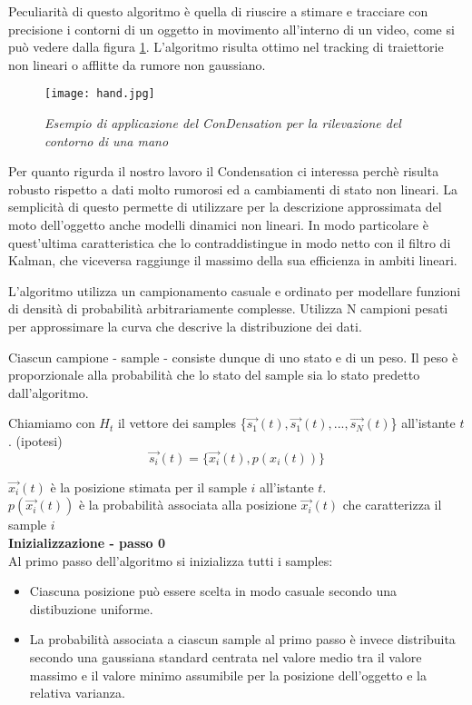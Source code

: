 Peculiarità di questo algoritmo è quella di riuscire a stimare e tracciare con precisione i contorni di un oggetto in movimento all'interno di un video, come si può vedere dalla figura \ref{fig:hand}. L'algoritmo risulta ottimo nel tracking di traiettorie non lineari o afflitte da rumore non gaussiano.

\begin{figure}[hb]
\centering
	\texttt{[image: hand.jpg]}
\caption{\textit{Esempio di applicazione del ConDensation per la rilevazione del contorno di una mano}\label{fig:hand}}
\end{figure}

Per quanto rigurda il nostro lavoro il Condensation ci interessa perchè risulta robusto rispetto a dati molto rumorosi ed a cambiamenti di stato non lineari. La semplicità di questo permette di utilizzare per la descrizione approssimata del moto dell'oggetto anche modelli dinamici non lineari. In modo particolare è quest'ultima caratteristica che lo contraddistingue in modo netto con il filtro di Kalman, che viceversa raggiunge il massimo della sua efficienza in ambiti lineari. 

L'algoritmo utilizza un campionamento casuale e ordinato per modellare funzioni di densità di probabilità arbitrariamente complesse. Utilizza N campioni pesati per approssimare la curva che descrive la distribuzione dei dati.

Ciascun campione - sample - consiste dunque di uno stato e di un peso. Il peso è proporzionale alla probabilità che lo stato del sample sia lo stato predetto dall'algoritmo.

Chiamiamo con $H_{t}$ il vettore dei samples \{$\overrightarrow{s_1}(t),\overrightarrow{s_1}(t),...,\overrightarrow{s_N}(t)$\} all'istante $t$. (ipotesi)
\begin{equation}
	\overrightarrow{s_i}(t)= \{\overrightarrow{x_i}(t),p(x_i(t))\}
\end{equation}

$\overrightarrow{x_i}(t)$ è la posizione stimata per il sample $i$ all'istante $t$.\\
$p(\overrightarrow{x_i}(t))$ è la probabilità associata alla posizione $\overrightarrow{x_i}(t)$ che caratterizza il sample $i$\\

\textbf{Inizializzazione - passo 0}\\
Al primo passo dell'algoritmo si inizializza tutti i samples:
\begin{itemize}
\item Ciascuna posizione può essere scelta in modo casuale secondo una distibuzione uniforme.
\item La probabilità associata a ciascun sample al primo passo è invece distribuita secondo una gaussiana standard centrata nel valore medio tra il valore massimo e il valore minimo assumibile per la posizione dell'oggetto e la relativa varianza.

\end{itemize}


